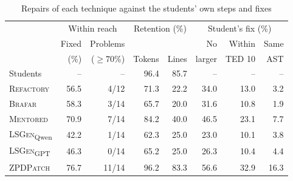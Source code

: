 \documentclass[conference]{IEEEtran}
\begin{document}
\begin{table}[h]
\caption{Repairs of each technique against the students' own steps and fixes}
\label{tab:rq1}
\centering\footnotesize
\setlength{\tabcolsep}{3pt}
\begin{tabular}{@{}l||rr|rr|rrr@{}}
\toprule
 & \multicolumn{2}{c|}{Within reach} & \multicolumn{2}{c|}{Retention (\%)} & \multicolumn{3}{c}{Student's fix (\%)} \\
 & Fixed & Problems & & & No & Within & Same \\
 & (\%) & ($\geq$70\%) & Tokens & Lines & larger & TED 10 & AST \\
\midrule
Students & -- & -- & 96.4 & 85.7 & -- & -- & -- \\
\midrule
\textsc{Refactory} & 56.5 & 4/12 & 71.3 & 22.2 & 34.0 & 13.0 & 3.2 \\
\textsc{Brafar} & 58.3 & 3/14 & 65.7 & 20.0 & 31.6 & 10.8 & 1.9 \\
\textsc{Mentored} & 70.9 & 7/14 & 84.2 & 40.0 & 46.5 & 23.1 & 7.7 \\
\textsc{LSGen}\textsubscript{Qwen} & 42.2 & 1/14 & 62.3 & 25.0 & 23.0 & 10.1 & 3.8 \\
\textsc{LSGen}\textsubscript{GPT} & 46.3 & 0/14 & 65.2 & 25.0 & 26.3 & 10.4 & 4.4 \\
\midrule
\textsc{ZPDPatch} & 76.7 & 11/14 & 96.2 & 83.3 & 56.6 & 32.9 & 16.3 \\
\bottomrule
\end{tabular}
\end{table}
\end{document}
